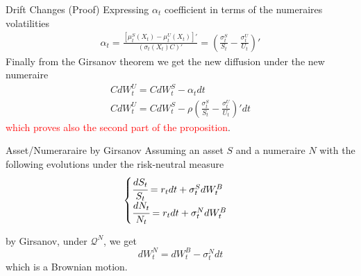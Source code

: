 \documentclass{beamer}
\begin{document}
\begin{frame}{Drift Changes (Proof)}
  Expressing $\alpha_t$ coefficient in terms of the numeraires volatilities
  \begin{equation}
    \begin{aligned}
      \alpha_t = \frac{[\mu_t^S(X_t) - \mu_t^U(X_t)]'}{(\sigma_t(X_t)C)'} = \left(\frac{\sigma^S_t}{S_t} - \frac{\sigma^U_t}{U_t}\right)'
    \end{aligned}
  \end{equation}
	\pause
  Finally from the Girsanov theorem we get the new diffusion under the new numeraire
  \begin{equation}
    \begin{gathered}
      CdW^U_t = CdW^S_t - \alpha_t dt \\
      CdW^U_t = CdW^S_t - \rho\left(\frac{\sigma^S_t}{S_t}-\frac{\sigma^U_t}{U_t}\right)' dt
    \end{gathered}
  \end{equation}
  \textcolor{red}{which proves also the second part of the proposition}.
  
\end{frame}

\begin{frame}{Asset/Numeraraire by Girsanov}
  Assuming an asset $S$ and a numeraire $N$ with the following evolutions under the risk-neutral measure
  \begin{equation}
    \begin{cases}
      \cfrac{dS_t}{S_t} = r_tdt + \sigma^S_t dW^B_t \\
      \cfrac{dN_t}{N_t} = r_tdt + \sigma^N_t dW^B_t
    \end{cases}
    \label{eq:S_N_dynamics}
  \end{equation}
  
  by Girsanov, under $\mathcal{Q}^N$, we get
  \begin{equation}
    dW^N_t = dW_t^B - \sigma_t^N dt
    \label{eq:girsanov_ex}
  \end{equation}
  which is a Brownian motion.
\end{frame}
\end{document}
